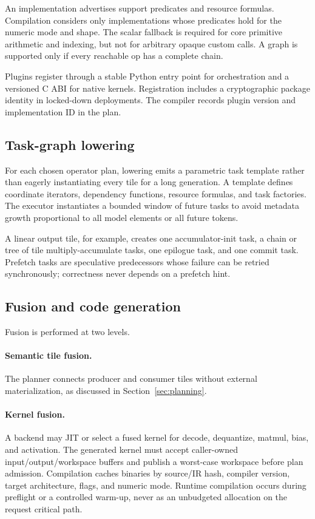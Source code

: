 An implementation advertises support predicates and resource formulas. Compilation considers only implementations whose predicates hold for the numeric mode and shape. The scalar fallback is required for core primitive arithmetic and indexing, but not for arbitrary opaque custom calls. A graph is supported only if every reachable op has a complete chain.

Plugins register through a stable Python entry point for orchestration and a versioned C ABI for native kernels. Registration includes a cryptographic package identity in locked-down deployments. The compiler records plugin version and implementation ID in the plan.

\subsection{Task-graph lowering}

For each chosen operator plan, lowering emits a parametric task template rather than eagerly instantiating every tile for a long generation. A template defines coordinate iterators, dependency functions, resource formulas, and task factories. The executor instantiates a bounded window of future tasks to avoid metadata growth proportional to all model elements or all future tokens.

A linear output tile, for example, creates one accumulator-init task, a chain or tree of tile multiply-accumulate tasks, one epilogue task, and one commit task. Prefetch tasks are speculative predecessors whose failure can be retried synchronously; correctness never depends on a prefetch hint.

\subsection{Fusion and code generation}

Fusion is performed at two levels.

\paragraph{Semantic tile fusion.}
The planner connects producer and consumer tiles without external materialization, as discussed in Section~\ref{sec:planning}.

\paragraph{Kernel fusion.}
A backend may JIT or select a fused kernel for decode, dequantize, matmul, bias, and activation. The generated kernel must accept caller-owned input/output/workspace buffers and publish a worst-case workspace before plan admission. Compilation caches binaries by source/IR hash, compiler version, target architecture, flags, and numeric mode. Runtime compilation occurs during preflight or a controlled warm-up, never as an unbudgeted allocation on the request critical path.

